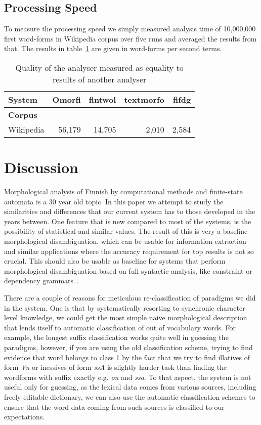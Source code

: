 \documentclass[a4paper,12pt]{article}
\begin{document}
\subsection{Processing Speed}

To measure the processing speed we simply measured analysis time of 10,000,000
first word-forms in Wikipedia corpus over five runs and averaged the results
from that. The results in table~\ref{table:speed} are given in word-forms per
second terms.

\begin{table}
    \centering
    \begin{tabular}{|l|r|r|r|r|}
        \hline
        \bf System & Omorfi & fintwol & textmorfo & fifdg \\
        \hline
        \bf Corpus &        &         &           & \\
        \hline
        Wikipedia & 56,179  & 14,705  & 2,010 & 2,584 \\
        \hline
    \end{tabular}
    \caption{Quality of the analyser measured as equality to results of
        another analyser \label{table:speed}}
\end{table}

\section{Discussion}
\label{sec:discussion}

Morphological analysis of Finnish by computational methods and finite-state
automata is a 30 year old topic. In this paper we attempt to study the
similarities and differences that our current system has to those developed in
the years between. One feature that is new compared to most of the systems, is
the possibility of statistical and similar values. The result of this is very a
baseline morphological disambiguation, which can be usable for information
extraction and similar applications where the accuracy requirement for top
results is not so crucial. This should also be usable as baseline for systems
that perform morphological disambiguation based on full syntactic analysis,
like constraint or dependency grammars~\cite{karlsson1995constraint}.

There are a couple of reasons for meticulous re-classification of paradigms
we did in the system. One is that by systematically resorting to synchronic
character level knowledge, we could get the most simple naive morphological
description that lends itself to automatic classification of out of vocabulary
words. For example, the longest suffix classification works quite well in
guessing the paradigms, however, if you are using the old classification
scheme, trying to find evidence that word belongs to class 1 by the fact that
we try to find illatives of form \emph{Vn} or inessives of form \emph{ssA} is
slightly harder task than finding the wordforms with suffix exactly e.g.
\emph{on} and \emph{ssa}. To that aspect, the system is not useful only
for guessing, as the lexical data comes from various sources, including
freely editable dictionary, we can also use the automatic classification
schemes to ensure that the word data coming from such sources is classified to
our expectations.
\end{document}
